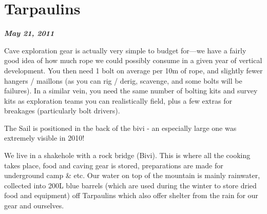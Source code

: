 
\newpage


\section{Tarpaulins}
\textbf{\textit{May 21, 2011}}

Cave exploration gear is actually very simple to budget for—we have
a fairly good idea of how much rope we could possibly consume in a
given year of vertical development. You then need 1 bolt on average
per 10m of rope, and slightly fewer hangers / maillons (as you can rig
/ derig, scavenge, and some bolts will be failures). In a similar
vein, you need the same number of bolting kits and survey kits as
exploration teams you can realistically field, plus a few extras for breakages (particularly bolt drivers).

\begin{pagefigure}
      \checkoddpage \ifoddpage \forcerectofloat \else \forceversofloat \fi
      \centering
  \caption{The Sail is positioned in the back of the bivi - an especially large one was extremely visible in 2010! } \label{2010 big tarp}
\end{pagefigure}

We live in a shakehole with a rock bridge (Bivi). This is where all
the cooking takes place, food and caving gear is stored, preparations
are made for underground camp \& etc. Our water on top of the mountain
is mainly rainwater, collected into 200L blue barrels (which are used
during the winter to store dried food and equipment) off Tarpaulins
which also offer shelter from the rain for our gear and ourselves.

